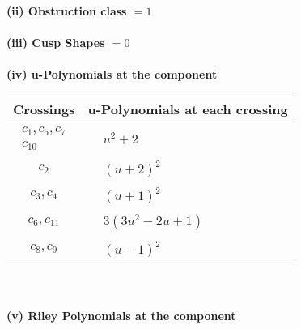 \documentclass[1p]{elsarticle_modified}
\theoremstyle{definition}
\begin{document}
\flushleft \textbf{(ii) Obstruction class $= 1$}\\~\\
\flushleft \textbf{(iii) Cusp Shapes $= 0$}\\~\\
\newpage\renewcommand{\arraystretch}{1}
\flushleft \textbf{(iv) u-Polynomials at the component}\newline \\
\begin{tabular}{m{50pt}|m{274pt}}
Crossings & \hspace{64pt}u-Polynomials at each crossing \\
\hline $$\begin{aligned}c_{1},c_{5},c_{7}\\c_{10}\end{aligned}$$&$\begin{aligned}
&u^2+2
\end{aligned}$\\
\hline $$\begin{aligned}c_{2}\end{aligned}$$&$\begin{aligned}
&(u+2)^2
\end{aligned}$\\
\hline $$\begin{aligned}c_{3},c_{4}\end{aligned}$$&$\begin{aligned}
&(u+1)^2
\end{aligned}$\\
\hline $$\begin{aligned}c_{6},c_{11}\end{aligned}$$&$\begin{aligned}
&3(3 u^2-2 u+1)
\end{aligned}$\\
\hline $$\begin{aligned}c_{8},c_{9}\end{aligned}$$&$\begin{aligned}
&(u-1)^2
\end{aligned}$\\
\hline
\end{tabular}\\~\\
\newpage\renewcommand{\arraystretch}{1}
\flushleft \textbf{(v) Riley Polynomials at the component}\newline \\
\end{document}
